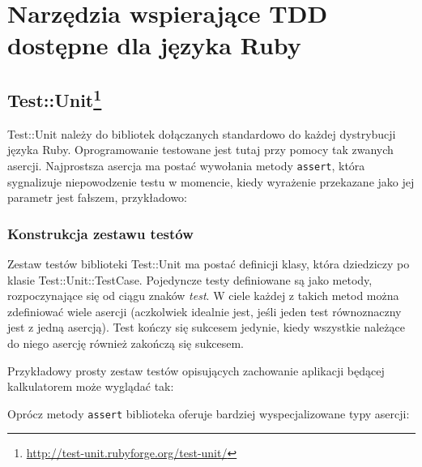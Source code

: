   \section{Narzędzia wspierające TDD dostępne dla języka Ruby}
    
    \subsection[Test::Unit]{Test::Unit\footnote{\url{http://test-unit.rubyforge.org/test-unit/}\nocite{test_unit}}}
    
    Test::Unit należy do bibliotek dołączanych standardowo do każdej dystrybucji języka Ruby. Oprogramowanie testowane jest tutaj przy pomocy tak zwanych asercji. Najprostsza asercja ma postać wywołania metody \texttt{assert}, która sygnalizuje niepowodzenie testu w momencie, kiedy wyrażenie przekazane jako jej parametr jest fałszem, przykładowo:
    
    
     
     \subsubsection{Konstrukcja zestawu testów}
     Zestaw testów biblioteki Test::Unit ma postać definicji klasy, która dziedziczy po klasie Test::Unit::TestCase. Pojedyncze testy definiowane są jako metody, rozpoczynające się od ciągu znaków \emph{test}. W ciele każdej z takich metod można zdefiniować wiele asercji (aczkolwiek idealnie jest, jeśli jeden test równoznaczny jest z jedną asercją). Test kończy się sukcesem jedynie, kiedy wszystkie należące do niego asercję również zakończą się sukcesem.
     
     Przykładowy prosty zestaw testów opisujących zachowanie aplikacji będącej kalkulatorem może wyglądać tak:
     
     
     
     Oprócz metody \texttt{assert} biblioteka oferuje bardziej wyspecjalizowane typy asercji:
     
